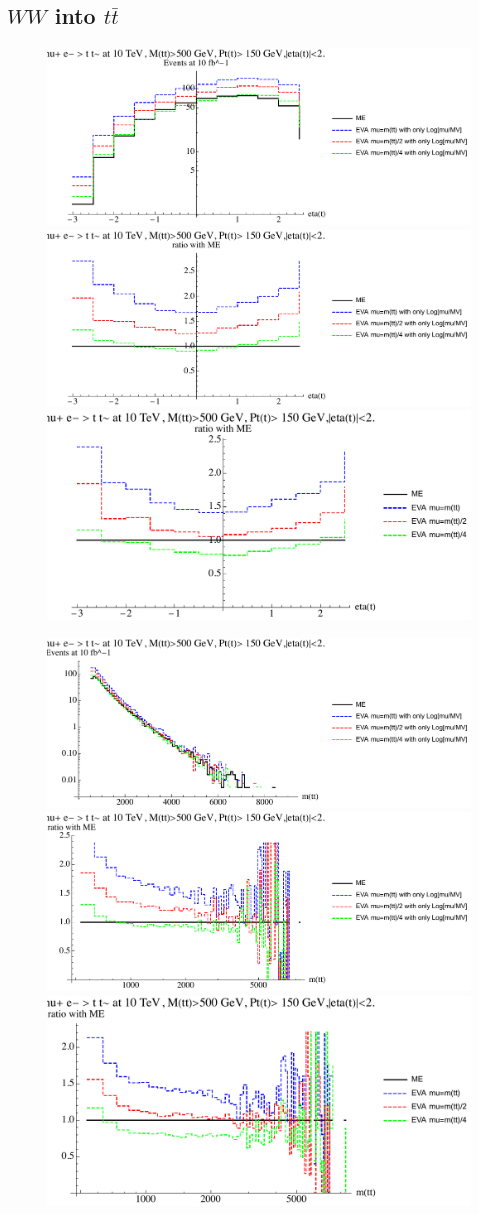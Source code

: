 \documentclass[a4paper,11pt]{article}
\begin{document}
\clearpage
\subsection{$WW$ into $t \bar t$}

\begin{figure}[ht]
\includegraphics[width=0.46\linewidth]{PlotDistr/WW_tt/10TeVcuts/plotetat.pdf}
\includegraphics[width=0.46\linewidth]{PlotDistr/WW_tt/10TeVcuts/plotetatratio1.pdf}
\includegraphics[width=0.46\linewidth]{PlotDistr/WW_tt/10TeVcuts/plotetatratio2.pdf}
\end{figure}

\begin{figure}[ht]
\includegraphics[width=0.46\linewidth]{PlotDistr/WW_tt/10TeVcuts/plotmtt.pdf}
\includegraphics[width=0.46\linewidth]{PlotDistr/WW_tt/10TeVcuts/plotmttratio1.pdf}
\includegraphics[width=0.46\linewidth]{PlotDistr/WW_tt/10TeVcuts/plotmttratio2.pdf}
\end{figure}
\end{document}
